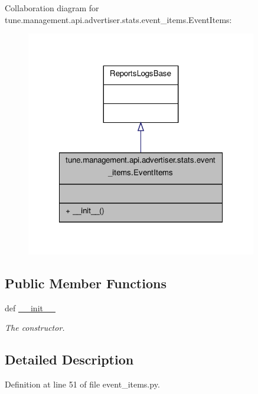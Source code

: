 Collaboration diagram for tune.\-management.\-api.\-advertiser.\-stats.\-event\-\_\-items.\-Event\-Items\-:
\nopagebreak
\begin{figure}[H]
\begin{center}
\leavevmode
\includegraphics[width=286pt]{classtune_1_1management_1_1api_1_1advertiser_1_1stats_1_1event__items_1_1EventItems__coll__graph}
\end{center}
\end{figure}
\subsection*{Public Member Functions}
\begin{DoxyCompactItemize}
\item 
def \hyperlink{classtune_1_1management_1_1api_1_1advertiser_1_1stats_1_1event__items_1_1EventItems_aa5989b22c37e1bbe7ae8d12d1d3d9a87}{\-\_\-\-\_\-init\-\_\-\-\_\-}
\begin{DoxyCompactList}\small\item\em The constructor. \end{DoxyCompactList}\end{DoxyCompactItemize}


\subsection{Detailed Description}


Definition at line 51 of file event\-\_\-items.\-py.



